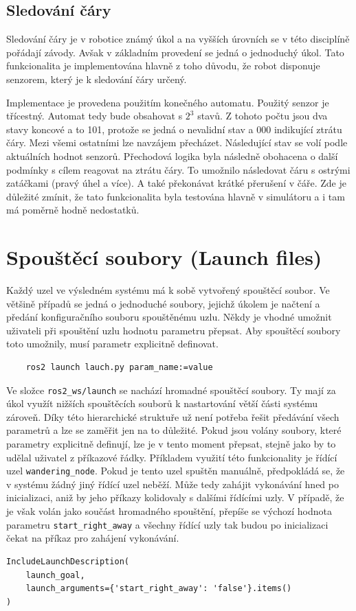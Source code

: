 \subsection*{Sledování čáry}
Sledování čáry je v robotice známý úkol a na vyšších úrovních se v této disciplíně pořádají závody. Avšak v základním provedení se jedná o jednoduchý úkol. Tato funkcionalita je implementována hlavně z toho důvodu, že robot disponuje senzorem, který je k sledování čáry určený.

Implementace je provedena použitím konečného automatu. Použitý senzor je třícestný. Automat tedy bude obsahovat s $2^3$ stavů. Z tohoto počtu jsou dva stavy koncové a to 101, protože se jedná o nevalidní stav a 000 indikující ztrátu čáry. Mezi všemi ostatními lze navzájem přecházet. Následující stav se volí podle aktuálních hodnot senzorů. Přechodová logika byla následně obohacena o další podmínky s cílem reagovat na ztrátu čáry. To umožnilo následovat čáru s ostrými zatáčkami (pravý úhel a více). A také překonávat krátké přerušení v čáře. Zde je důležité zmínit, že tato funkcionalita byla testována hlavně v simulátoru a i tam má poměrně hodně nedostatků. 

\section{Spouštěcí soubory (Launch files)}
Každý uzel ve výsledném systému má k sobě vytvořený spouštěcí soubor. Ve většině případů se jedná o jednoduché soubory, jejichž úkolem je načtení a předání konfiguračního souboru spouštěnému uzlu. Někdy je vhodné umožnit uživateli při spouštění uzlu hodnotu parametru přepsat. Aby spouštěcí soubory toto umožnily, musí parametr explicitně definovat.
\begin{verbatim}
	ros2 launch lauch.py param_name:=value
\end{verbatim}
Ve složce \verb|ros2_ws/launch| se nachází hromadné spouštěcí soubory. Ty mají za úkol využít nižších spouštěcích souborů k nastartování větší části systému zároveň. Díky této hierarchické struktuře už není potřeba řešit předávání všech parametrů a lze se zaměřit jen na to důležité. Pokud jsou volány soubory, které parametry explicitně definují, lze je v tento moment přepsat, stejně jako by to udělal uživatel z příkazové řádky. Příkladem využití této funkcionality je řídící uzel \verb|wandering_node|. Pokud je tento uzel spuštěn manuálně, předpokládá se, že v systému žádný jiný řídící uzel neběží. Může tedy zahájit vykonávání hned po inicializaci, aniž by jeho příkazy kolidovaly s dalšími řídícími uzly. V případě, že je však volán jako součást hromadného spouštění, přepíše se výchozí hodnota parametru \verb|start_right_away| a všechny řídící uzly tak budou po inicializaci čekat na příkaz pro zahájení vykonávání.
\begin{verbatim}
IncludeLaunchDescription(
    launch_goal,
    launch_arguments={'start_right_away': 'false'}.items()
)
\end{verbatim}

